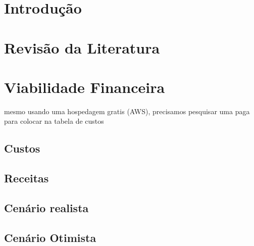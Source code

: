 \documentclass[
12pt,				%
openany,			%
oneside,			%
a4paper,			%
english,			%
french,				%
spanish,			%
brazil				%
]{abntex2}
\begin{document}
	\tableofcontents*
	\cleardoublepage

	\textual
	
	\chapter{Introdução}
		


	
	\chapter{Revisão da Literatura}
	
	
		
	
	
	
	
	
	
	
	\chapter{Viabilidade Financeira}
	
	mesmo usando uma hospedagem gratis (AWS), precisamos pesquisar uma paga para colocar na tabela de custos
	
	\section{Custos}
	
	\section{Receitas}
	\section{Cenário realista}
	\section{Cenário Otimista}
\end{document}
